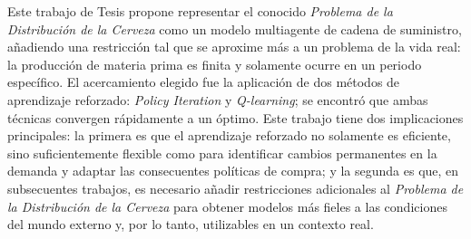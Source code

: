 
Este trabajo de Tesis propone representar el conocido \textit{Problema de la Distribuci\'on de la Cerveza} como un modelo multiagente de cadena de suministro, a\~nadiendo una restricci\'on tal que se aproxime m\'as a un problema de la vida real: la producci\'on de materia prima es finita y solamente ocurre en un periodo espec\'ifico. El acercamiento elegido fue la aplicaci\'on de dos m\'etodos de aprendizaje reforzado: \textit{Policy Iteration} y \textit{Q-learning}; se encontr\'o que ambas t\'ecnicas convergen r\'apidamente a un \'optimo. Este trabajo tiene dos implicaciones principales: la primera es que el aprendizaje reforzado no solamente es eficiente, sino suficientemente flexible como para identificar cambios permanentes en la demanda y adaptar las consecuentes pol\'iticas de compra; y la segunda es que, en subsecuentes trabajos, es necesario a\~nadir restricciones adicionales al \textit{Problema de la Distribuci\'on de la Cerveza} para obtener modelos m\'as fieles a las condiciones del mundo externo y, por lo tanto, utilizables en un contexto real.
